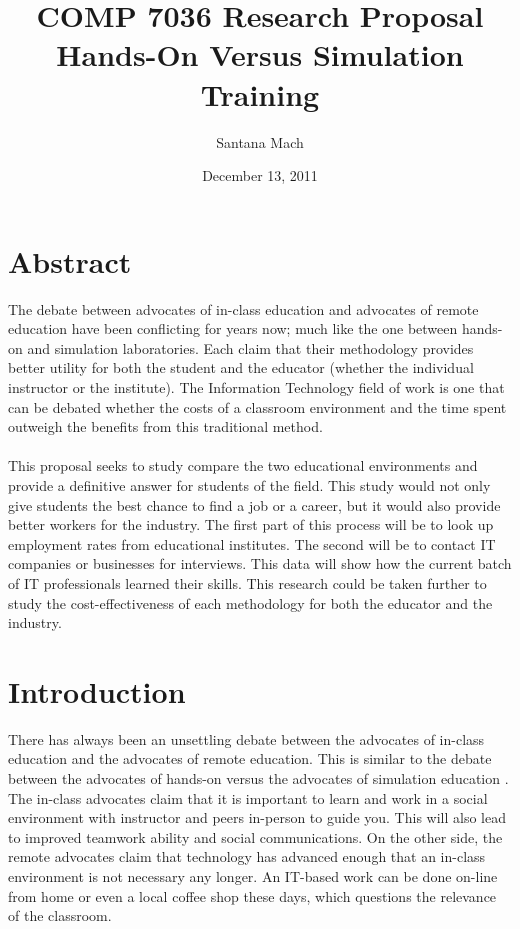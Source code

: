 \documentclass[titlepage]{article}
\begin{document}
\author{Santana Mach}
\title{COMP 7036 Research Proposal \\ Hands-On Versus Simulation Training}
\date{December 13, 2011}
\maketitle{}

\tableofcontents
\pagebreak
\onehalfspacing

\section{Abstract}
The debate between advocates of in-class education and advocates of remote education have
been conflicting for years now; much like the one between hands-on and simulation laboratories.
Each claim that their methodology provides better utility for both the student and the
educator (whether the individual instructor or the institute).  The Information Technology
field of work is one that can be debated whether the costs of a classroom environment
and the time spent outweigh the benefits from this traditional method.\\\\
This proposal seeks to study compare the two educational environments and provide a
definitive answer for students of the field.  This study would not only give students the
best chance to find a job or a career, but it would also provide better workers for the
industry.  The first part of this process will be to look up employment rates
from educational institutes.  The second will be to contact IT companies or businesses
for interviews.  This data will show how the current batch of IT professionals learned
their skills.  This research could be taken further to study the cost-effectiveness of
each methodology for both the educator and the industry.

\clearpage

\section{Introduction}

There has always been an unsettling debate between the advocates of in-class education
and the advocates of remote education.  This is similar to the debate between the advocates
of hands-on versus the advocates of simulation education \citep{2}. The in-class advocates claim that
it is important to learn and work in a social environment with instructor and peers in-person
to guide you.  This will also lead to improved teamwork ability and social communications.
On the other side, the remote advocates claim that technology has advanced enough that an
in-class environment is not necessary any longer.  An IT-based work can be done on-line
from home or even a local coffee shop these days, which questions the relevance of the classroom.\\
\end{document}
